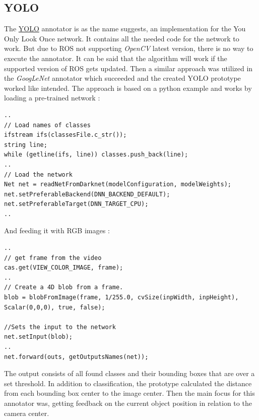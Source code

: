 \documentclass[main.tex]{subfiles}
\begin{document}
                \subsection{YOLO}
The \href{https://github.com/SUTURO/suturo_perception/blob/Handcamera_tracking/rs_Athene/src/Yolo.cpp}{YOLO} annotator is as the name suggests, an implementation for the You Only Look Once network. It contains all the needed code for the network to work.
But due to ROS not supporting \textit{OpenCV} latest version, there is no way to execute the annotator. It can be said that the algorithm will work if the supported version of ROS gets updated. Then a similar approach was utilized in the \textit{GoogLeNet} annotator which succeeded and the created YOLO prototype worked like intended.
The approach is based on a python example and works by loading a pre-trained network : 
\begin{lstlisting}
..
// Load names of classes
ifstream ifs(classesFile.c_str());
string line;
while (getline(ifs, line)) classes.push_back(line);
..
// Load the network
Net net = readNetFromDarknet(modelConfiguration, modelWeights);
net.setPreferableBackend(DNN_BACKEND_DEFAULT);
net.setPreferableTarget(DNN_TARGET_CPU);
..
\end{lstlisting}
And feeding it with RGB images : 
\begin{lstlisting}
..
// get frame from the video
cas.get(VIEW_COLOR_IMAGE, frame);
..
// Create a 4D blob from a frame.
blob = blobFromImage(frame, 1/255.0, cvSize(inpWidth, inpHeight), Scalar(0,0,0), true, false);
        
//Sets the input to the network
net.setInput(blob);
..
net.forward(outs, getOutputsNames(net));
\end{lstlisting}

The output consists of all found classes and their bounding boxes that are over a set threshold.
In addition to classification, the prototype calculated the distance from each bounding box center to the image center. 
Then the main focus for this annotator was, getting feedback on the current object position in relation to the camera center.
\end{document}
